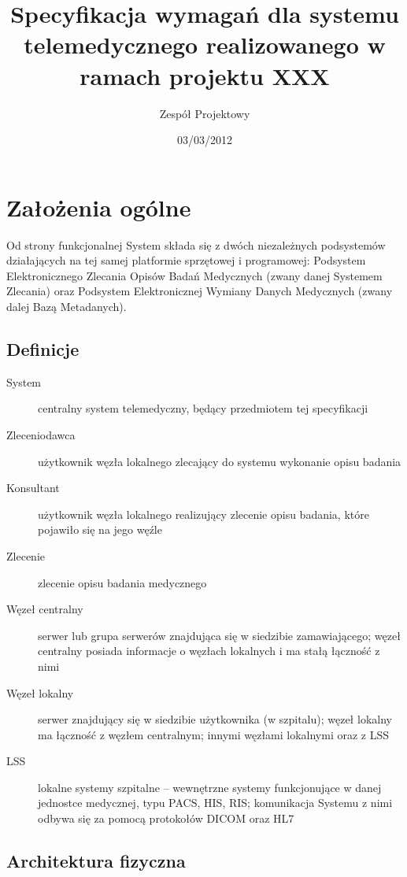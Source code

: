 \documentclass[a4paper]{report}
\begin{document}
\title{Specyfikacja wymagań dla systemu telemedycznego realizowanego w ramach projektu XXX}
\author{Zespół Projektowy}
\date{03/03/2012}
\maketitle

\tableofcontents

\chapter{Założenia ogólne}

Od strony funkcjonalnej System składa się z dwóch niezależnych podsystemów działających na tej samej platformie sprzętowej i programowej: Podsystem Elektronicznego Zlecania Opisów Badań Medycznych (zwany danej Systemem Zlecania) oraz Podsystem Elektronicznej Wymiany Danych Medycznych (zwany dalej Bazą Metadanych).

\section{Definicje}

\begin{description}
\item[System] centralny system telemedyczny, będący przedmiotem tej specyfikacji
\item[Zleceniodawca] użytkownik węzła lokalnego zlecający do systemu wykonanie opisu badania
\item[Konsultant] użytkownik węzła lokalnego realizujący zlecenie opisu badania, które pojawiło się na jego węźle
\item[Zlecenie] zlecenie opisu badania medycznego
\item[Węzeł centralny] serwer lub grupa serwerów znajdująca się w siedzibie zamawiającego; węzeł centralny posiada informacje o węzłach lokalnych i ma stałą łączność z nimi
\item[Węzeł lokalny] serwer znajdujący się w siedzibie użytkownika (w szpitalu); węzeł lokalny ma łączność z węzłem centralnym; innymi węzłami lokalnymi oraz z LSS
\item[LSS] lokalne systemy szpitalne -- wewnętrzne systemy funkcjonujące w danej jednostce medycznej, typu PACS, HIS, RIS; komunikacja Systemu z nimi odbywa się za pomocą protokołów DICOM oraz HL7
\end{description}

\section{Architektura fizyczna}
\label{sec:arch_fiz}
\end{document}
